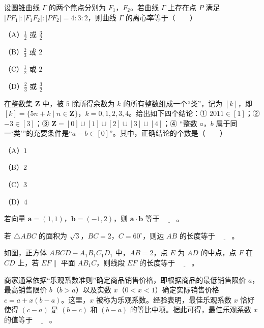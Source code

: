 \begin{question}
设圆锥曲线 $\Gamma$ 的两个焦点分别为 $F_1$，$F_2$。若曲线 $\Gamma$ 上存在点 $P$ 满足 $|PF_1|:|F_1F_2|:|PF_2|=4:3:2$，则曲线 $\Gamma$ 的离心率等于\mbox{（　　）}

（A）$\frac12$ 或 $\frac32$

（B）$\frac23$ 或 $2$

（C）$\frac12$ 或 $2$

（D）$\frac23$ 或 $\frac32$

\end{question}
\begin{question}
在整数集 $\mathbf Z$ 中，被 $5$ 除所得余数为 $k$ 的所有整数组成一个“类”，记为 $[k]$，即 $[k]=\{5n+k\mid n\in\mathbf Z\}$，$k=0,1,2,3,4$。给出如下四个结论：① $2011\in[1]$；② $-3\in[3]$；③ $\mathbf Z=[0]\cup[1]\cup[2]\cup[3]\cup[4]$；④ “整数 $a$，$b$ 属于同一‘类’”的充要条件是“$a-b\in[0]$”。其中，正确结论的个数是\mbox{（　　）}

（A）$1$

（B）$2$

（C）$3$

（D）$4$

\end{question}

\begin{question}
若向量 $\boldsymbol a=(1,1)$，$\boldsymbol b=(-1,2)$，则 $\boldsymbol a\cdot\boldsymbol b$ 等于 $\underline{\qquad}$。

\end{question}
\begin{question}
若 $\triangle ABC$ 的面积为 $\sqrt3$，$BC=2$，$C=60^\circ$，则边 $AB$ 的长度等于 $\underline{\qquad}$。

\Needspace{0.4\textheight}
\end{question}
\begin{question}
如图，正方体 $ABCD-A_1B_1C_1D_1$ 中，$AB=2$，点 $E$ 为 $AD$ 的中点，点 $F$ 在 $CD$ 上，若 $EF\parallel$ 平面 $AB_1C$，则线段 $EF$ 的长度等于 $\underline{\qquad}$。
\nopagebreak[4]
\begin{center}\end{center}
\nopagebreak[4]
\end{question}
\begin{question}
商家通常依据“乐观系数准则”确定商品销售价格，即根据商品的最低销售限价 $a$，最高销售限价 $b$（$b>a$）以及实数 $x$（$0<x<1$）确定实际销售价格 $c=a+x(b-a)$。这里，$x$ 被称为乐观系数。经验表明，最佳乐观系数 $x$ 恰好使得 $(c-a)$ 是 $(b-c)$ 和 $(b-a)$ 的等比中项。据此可得，最佳乐观系数 $x$ 的值等于 $\underline{\qquad}$。

\end{question}

